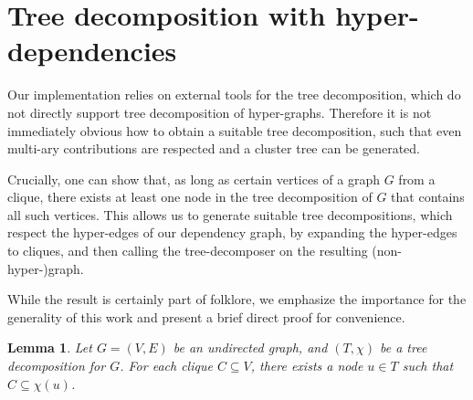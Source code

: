 \documentclass[10pt]{article}
\newtheorem{lemma}[theorem]{Lemma}
\begin{document}
\section{Tree decomposition with hyper-dependencies}
\label{appsec:dependency-cliques}

Our implementation relies on external tools for the tree decomposition, which do not directly support tree decomposition of hyper-graphs. Therefore it is not immediately obvious how 
to obtain a suitable tree decomposition, such that even multi-ary contributions are respected and a cluster tree can be generated.

Crucially, one can show that, as long as certain vertices of a graph $G$ from a clique, there exists at least one node in the tree decomposition of $G$ that contains all such vertices.
%
This allows us to generate suitable tree decompositions, which respect the hyper-edges of our dependency graph, by expanding the hyper-edges to cliques, and then calling the tree-decomposer on the resulting (non-hyper-)graph.

%
While the result is certainly part of folklore, we emphasize the importance for the generality of this work and present a brief direct proof for convenience.

\begin{lemma}\label{lem:cliques}
Let $G=(V,E)$ be an undirected graph, and  $(T,\chi)$ be a tree decomposition for $G$. For each clique $C\subseteq V$, there exists a node $u \in T$ such that $C\subseteq\chi(u)$.
\end{lemma}
\end{document}
